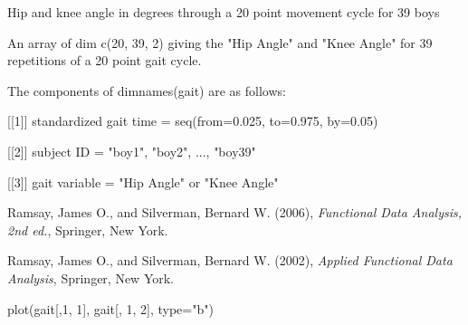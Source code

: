 \documentclass{article}
\begin{document}
\begin{Description}\relax
Hip and knee angle in degrees through a 20 point movement cycle for 39
boys
\end{Description}
\begin{Format}\relax
An array of dim c(20, 39, 2) giving the "Hip Angle" and "Knee Angle"
for 39 repetitions of a 20 point gait cycle.
\end{Format}
\begin{Details}\relax
The components of dimnames(gait) are as follows:

[[1]] standardized gait time = seq(from=0.025, to=0.975, by=0.05) 

[[2]] subject ID = "boy1", "boy2", ..., "boy39"  

[[3]] gait variable = "Hip Angle" or "Knee Angle"
\end{Details}
\begin{Source}\relax
Ramsay, James O., and Silverman, Bernard W. (2006), \emph{Functional
Data Analysis, 2nd ed.}, Springer, New York.

Ramsay, James O., and Silverman, Bernard W. (2002), \emph{Applied
Functional Data Analysis}, Springer, New York.
\end{Source}
\begin{Examples}
\begin{ExampleCode}
plot(gait[,1, 1], gait[, 1, 2], type="b")
\end{ExampleCode}
\end{Examples}
\end{document}
